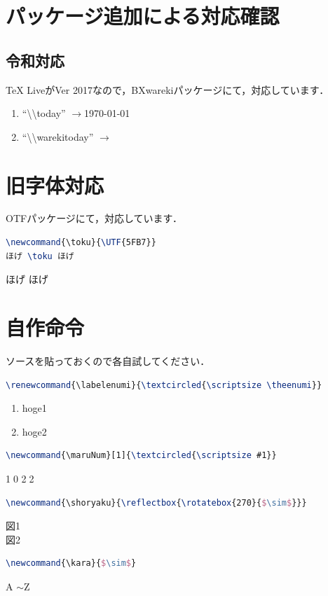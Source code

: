 \documentclass[10pt]{jarticle}
\newcommand{\zr}{$\rightarrow$}
\begin{document}
\section{パッケージ追加による対応確認}
\subsection{令和対応}
TeX LiveがVer 2017なので，BXwarekiパッケージ\cite{bxwareki}にて，対応しています．

\begin{enumerate}
	\item ``\textbackslash\textbackslash  today'' \zr \today
	\item ``\textbackslash\textbackslash warekitoday'' \zr \warekitoday
\end{enumerate}

\section{旧字体対応}
OTFパッケージにて，対応しています．
{
	\begin{lstlisting}[language=TeX,caption=旧字体]
\newcommand{\toku}{\UTF{5FB7}}
ほげ \toku ほげ
	\end{lstlisting}

	\newcommand{\toku}{}
	ほげ \toku ほげ
}

\section{自作命令}
ソースを貼っておくので各自試してください．

\begin{lstlisting}[language=TeX, caption=enumiを丸数字に]
\renewcommand{\labelenumi}{\textcircled{\scriptsize \theenumi}} 
\end{lstlisting}

\begin{enumerate}
	\renewcommand{\labelenumi}{\textcircled{\scriptsize \theenumi}} %
	\item hoge1
	\item hoge2
\end{enumerate}

\begin{lstlisting}[language=TeX, caption=丸で文字を加工]
\newcommand{\maruNum}[1]{\textcircled{\scriptsize #1}} 
\end{lstlisting}
{
	\newcommand{\maruNum}[1]{\textcircled{\scriptsize #1}} %
	\maruNum{10} \maruNum{22}
}

\begin{lstlisting}[language=TeX, caption=縦省略記号]
\newcommand{\shoryaku}{\reflectbox{\rotatebox{270}{$\sim$}}} 
\end{lstlisting}
{
	\newcommand{\shoryaku}{} %
	図1 
	\shoryaku \\
	図2
}

\begin{lstlisting}[language=TeX, caption=横省略記号]
\newcommand{\kara}{$\sim$} 
\end{lstlisting}
{
	\newcommand{\kara}{$\sim$} %
	A \kara Z
}	



\end{document}
